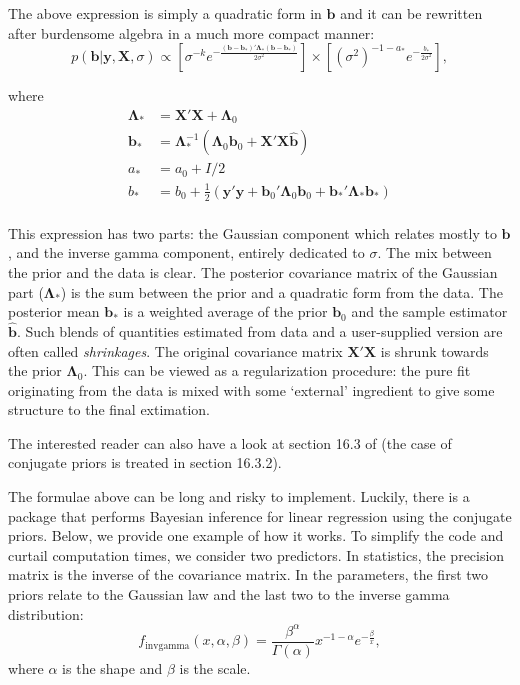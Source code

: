 \documentclass[]{krantz}
\theoremstyle{definition}
\theoremstyle{definition}
\theoremstyle{definition}
\theoremstyle{remark}
\begin{document}
The above expression is simply a quadratic form in \(\textbf{b}\) and it
can be rewritten after burdensome algebra in a much more compact manner:
\begin{equation}
\label{eq:linpost}
p(\textbf{b}|\textbf{y},\textbf{X},\sigma) \propto \left[\sigma^{-k}e^{-\frac{(\textbf{b}-\textbf{b}_*)'\boldsymbol{\Lambda}_*(\textbf{b}-\textbf{b}_*)}{2\sigma^2}}\right] \times \left[ (\sigma^2)^{-1-a_*}e^{-\frac{b_*}{2\sigma^2}}  \right],
\end{equation}

where \begin{align*}
\boldsymbol{\Lambda}_* &= \textbf{X}'\textbf{X}+\boldsymbol{\Lambda}_0  \\
\textbf{b}_*&=  \boldsymbol{\Lambda}_*^{-1}(\boldsymbol{\Lambda}_0\textbf{b}_0+\textbf{X}'\textbf{X}\hat{\textbf{b}}) \\
a_* & = a_0 + I/2  \\
b_* &=b_0+\frac{1}{2}\left(\textbf{y}'\textbf{y}+ \textbf{b}_0'\boldsymbol{\Lambda}_0\textbf{b}_0+\textbf{b}_*'\boldsymbol{\Lambda}_*\textbf{b}_* \right)\\
\end{align*}

This expression has two parts: the Gaussian component which relates
mostly to \(\textbf{b}\), and the inverse gamma component, entirely
dedicated to \(\sigma\). The mix between the prior and the data is
clear. The posterior covariance matrix of the Gaussian part
(\(\boldsymbol{\Lambda}_*\)) is the sum between the prior and a
quadratic form from the data. The posterior mean \(\textbf{b}_*\) is a
weighted average of the prior \(\textbf{b}_0\) and the sample estimator
\(\hat{\textbf{b}}\). Such blends of quantities estimated from data and
a user-supplied version are often called \emph{shrinkages}. The original
covariance matrix \(\textbf{X}'\textbf{X}\) is shrunk towards the prior
\(\boldsymbol{\Lambda}_0\). This can be viewed as a regularization
procedure: the pure fit originating from the data is mixed with some
`external' ingredient to give some structure to the final extimation.

The interested reader can also have a look at section 16.3 of
\citet{greene2018econometric} (the case of conjugate priors is treated
in section 16.3.2).

The formulae above can be long and risky to implement. Luckily, there is
a package that performs Bayesian inference for linear regression using
the conjugate priors. Below, we provide one example of how it works. To
simplify the code and curtail computation times, we consider two
predictors. In statistics, the precision matrix is the inverse of the
covariance matrix. In the parameters, the first two priors relate to the
Gaussian law and the last two to the inverse gamma distribution:
\[f_\text{invgamma}(x, \alpha, \beta)=\frac{\beta^\alpha}{\Gamma(\alpha)}x^{-1-\alpha}e^{-\frac{\beta}{x}},\]
where \(\alpha\) is the shape and \(\beta\) is the scale.
\end{document}
